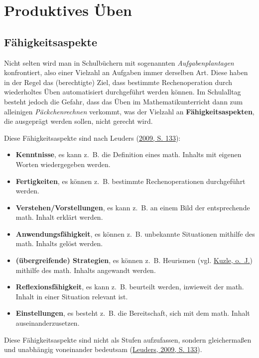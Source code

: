 \documentclass[
]{scrbook}
\providecommand{\tightlist}{%
  \setlength{\itemsep}{0pt}\setlength{\parskip}{0pt}}
\theoremstyle{definition}
\theoremstyle{definition}
\theoremstyle{definition}
\theoremstyle{definition}
\theoremstyle{remark}
\begin{document}
\hypertarget{produktives-uxfcben}{%
\section{Produktives Üben}\label{produktives-uxfcben}}

\hypertarget{Faehigkeitsaspekte}{%
\subsection{Fähigkeitsaspekte}\label{Faehigkeitsaspekte}}

Nicht selten wird man in Schulbüchern mit sogenannten \emph{Aufgabenplantagen} konfrontiert, also einer Vielzahl an Aufgaben immer derselben Art. Diese haben in der Regel das (berechtigte) Ziel, dass bestimmte Rechenoperation durch wiederholtes Üben automatisiert durchgeführt werden können. Im Schulalltag besteht jedoch die Gefahr, dass das Üben im Mathematikunterricht dann zum alleinigen \emph{Päckchenrechnen} verkommt, was der Vielzahl an \textbf{Fähigkeitsaspekten}, die ausgeprägt werden sollen, nicht gerecht wird.

Diese Fähigkeitsaspekte sind nach Leuders (\protect\hyperlink{ref-Leuders2009}{2009, S. 133}):

\begin{itemize}
\tightlist
\item
  \textbf{Kenntnisse}, es kann z.~B. die Definition eines math. Inhalts mit eigenen Worten wiedergegeben werden.
\item
  \textbf{Fertigkeiten}, es können z.~B. bestimmte Rechenoperationen durchgeführt werden.
\item
  \textbf{Verstehen/Vorstellungen}, es kann z.~B. an einem Bild der entsprechende math. Inhalt erklärt werden.
\item
  \textbf{Anwendungsfähigkeit}, es können z.~B. unbekannte Situationen mithilfe des math. Inhalts gelöst werden.
\item
  \textbf{(übergreifende) Strategien}, es können z.~B. Heurismen (vgl. \protect\hyperlink{ref-Kuzle}{Kuzle, o.~J.}) mithilfe des math. Inhalts angewandt werden.
\item
  \textbf{Reflexionsfähigkeit}, es kann z.~B. beurteilt werden, inwieweit der math. Inhalt in einer Situation relevant ist.
\item
  \textbf{Einstellungen}, es besteht z.~B. die Bereitschaft, sich mit dem math. Inhalt auseinanderzusetzen.
\end{itemize}

Diese Fähigkeitsaspekte sind nicht als Stufen aufzufassen, sondern gleichermaßen und unabhängig voneinander bedeutsam (\protect\hyperlink{ref-Leuders2009}{Leuders, 2009, S. 133}).
\end{document}
